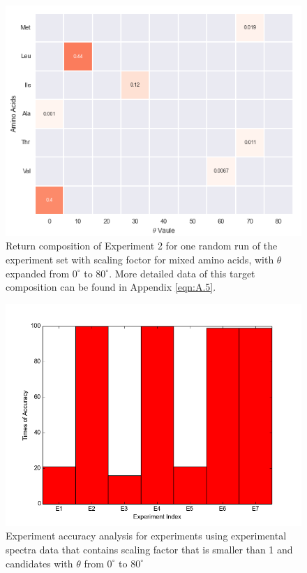 \begin{figure}[!ht] 
\centering
\includegraphics[scale=0.9]{Figures/chapter6_figure_two.png}
\caption{Return composition of Experiment 2 for one random run of the experiment set with scaling foctor for mixed amino acids, with $\theta$ expanded from $0^{\circ}$ to $80^{\circ}$. More detailed data of this target composition can be found in Appendix \ref{eqn:A.5}.} \label{fig:6.2}
\end{figure}

\begin{figure}[!ht] 
\centering
\includegraphics[scale=0.6]{Figures/chapter6_1.png}
\caption{Experiment accuracy analysis for experiments using experimental spectra data that contains scaling factor that is smaller than 1 and candidates with $\theta$ from $0^{\circ}$ to $80^{\circ}$}
\label{fig:6.3}
\end{figure}

